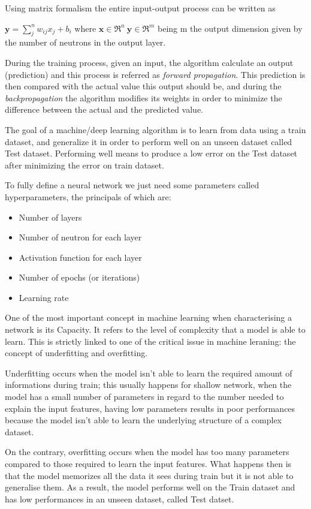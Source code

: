 \documentclass[a4paper,11pt]{article}
\begin{document}
Using matrix formalism the entire input-output process can be written as

$\textbf{y} = \sum_j^n w_{ij} x_j + b_i $ where $\textbf{x} \in \Re^n \ \textbf{y} \in \Re^m $ being m the output dimension given by the number of neutrons in the output layer.


During the training process, given an input, the algorithm calculate an output (prediction) and this process is referred as  \emph{forward propagation}.
This prediction is then compared with the actual value this output should be, and during the \emph{backpropagation} the algorithm modifies its weights in order to minimize the difference between the actual and the predicted value.

The goal of a machine/deep learning algorithm is to learn from data using a train dataset, and generalize it in order to perform well on an unseen dataset called Test dataset.
Performing well means to produce a low error on the Test dataset after minimizing the error on train dataset.


To fully define a neural network we just need some parameters called hyperparameters, the principals of which are:

\begin{itemize}
\item Number of layers
\item Number of neutron for each layer
\item Activation function for each layer
\item Number of epochs (or iterations)
\item Learning rate
\end{itemize}




One of the most important concept in machine learning when characterising a network is its Capacity.
It refers to the level of complexity that a model is able to learn.
This is strictly linked to one of the critical issue in machine leraning: the concept of underfitting and overfitting.

Underfitting occurs when the model isn't able to learn the required amount of informations during train; this usually happens for shallow network, when the model has a small number of parameters in regard to the number needed to explain the input features, having low parameters results in poor performances because the model isn't able to learn the underlying structure of a complex dataset.

On the contrary, overfitting occurs when the model has too many parameters compared to those required to learn the input features.
What happens then is that the model memorizes all the data it sees during train but it is not able to generalise them.
As a result, the model performs well on the Train dataset and has low performances in an unseen dataset, called Test datset.
\end{document}
